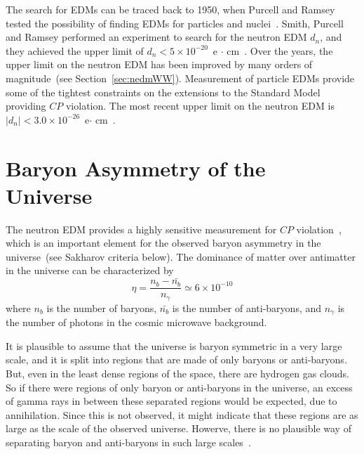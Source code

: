 
The search for EDMs can be traced back to 1950, when Purcell and
Ramsey tested the possibility of finding EDMs for particles and
nuclei~\cite{PhysRev.78.807}. Smith, Purcell and Ramsey performed an
experiment to search for the neutron EDM $d_n$, and they achieved the
upper limit of $d_n < 5 \times 10^{-20}$~e $\cdot$
cm~\cite{smith1957experimental}.  Over the years, the upper limit on
the neutron EDM has been improved by many orders of magnitude~(see
Section~\ref{sec:nedmWW}). Measurement of particle EDMs provide some
of the tightest constraints on the extensions to the Standard Model
providing $CP$ violation. The most recent upper limit on the neutron
EDM is $\vert d_n\vert < 3.0 \times 10^{-26} $~e$\cdot$
cm~\cite{Baker2006, pendlebury2015revised}.



\section{Baryon Asymmetry of the Universe\label{sec:BAU}}
The neutron EDM provides a highly sensitive measurement for $CP$
violation~\cite{pospelov2005electric, Abel2001}, which is an important
element for the observed baryon asymmetry in the universe~(see
Sakharov criteria below). The dominance of matter over antimatter in
the universe can be characterized by~\cite{Cline}
\begin{equation}
\eta = \frac{n_b-\bar{n_b}}{n_{\gamma}} \simeq 6 \times 10^{-10}
\end{equation}
where $n_b$ is the number of baryons, $\bar{n_b}$ is the number of
anti-baryons, and $n_{\gamma}$ is the number of photons in the cosmic
microwave background.

It is plausible to assume that the universe is baryon symmetric in a
very large scale, and it is split into regions that are made of only
baryons or anti-baryons.  But, even in the least dense regions of the
space, there are hydrogen gas clouds. So if there were regions of only
baryon or anti-baryons in the universe, an excess of gamma rays in
between these separated regions would be expected, due to
annihilation. Since this is not observed, it might indicate that these
regions are as large as the scale of the observed universe. Howerve,
there is no plausible way of separating baryon and anti-baryons in
such large scales~\cite{Cline}.

